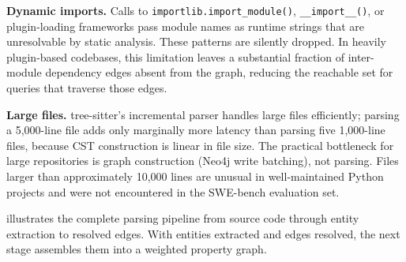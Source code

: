 \textbf{Dynamic imports.} Calls to \texttt{importlib.import\_module()}, \texttt{\_\_import\_\_()}, or plugin-loading frameworks pass module names as runtime strings that are unresolvable by static analysis. These patterns are silently dropped. In heavily plugin-based codebases, this limitation leaves a substantial fraction of inter-module dependency edges absent from the graph, reducing the reachable set for queries that traverse those edges.

\textbf{Large files.} tree-sitter's incremental parser handles large files efficiently; parsing a 5,000-line file adds only marginally more latency than parsing five 1,000-line files, because CST construction is linear in file size. The practical bottleneck for large repositories is graph construction (Neo4j write batching), not parsing. Files larger than approximately 10,000 lines are unusual in well-maintained Python projects and were not encountered in the SWE-bench evaluation set.

 illustrates the complete parsing pipeline from source code through entity extraction to resolved edges. With entities extracted and edges resolved, the next stage assembles them into a weighted property graph.

